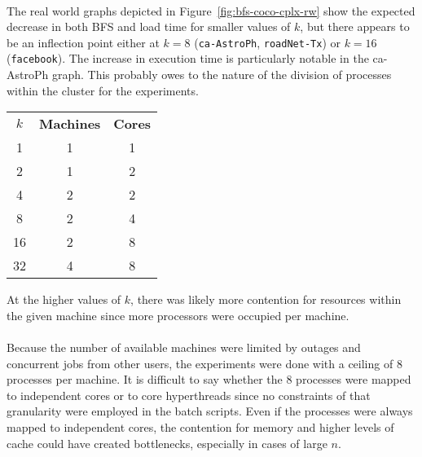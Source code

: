 \documentclass[11pt,epsf]{article}
\begin{document}
{{    \paragraph{}{
      The real world graphs depicted in Figure~\ref{fig:bfs-coco-cplx-rw} show the expected decrease
      in both BFS and load time for smaller values of $k$, but there appears to be an inflection point
      either at $k = 8$ (\texttt{ca-AstroPh}, \texttt{roadNet-Tx}) or $k = 16$ (\texttt{facebook}).
      The increase in execution time is particularly notable in the ca-AstroPh graph. This probably
      owes to the nature of the division of processes within the cluster for the experiments.
      \begin{longtable}{c|c|c}
        \textbf{$k$} & \textbf{Machines} & \textbf{Cores} \\
        1 & 1 & 1 \\
        2 & 1 & 2 \\
        4 & 2 & 2 \\
        8 & 2 & 4 \\
        16 & 2 & 8 \\
        32 & 4 & 8
      \end{longtable}
      At the higher values of $k$, there was likely more contention for resources within the given
      machine since more processors were occupied per machine.
    }
    \paragraph{}{
      Because the number of available machines were limited by outages and concurrent jobs from
      other users, the experiments were done with a ceiling of 8 processes per machine.
      It is difficult to say whether the 8 processes were mapped to independent cores or to core
      hyperthreads since no constraints of that granularity were employed in the batch scripts.
      Even if the processes were always mapped to independent cores, the contention for memory
      and higher levels of cache could have created bottlenecks, especially in cases of large $n$.
    }
  }
}
\end{document}
